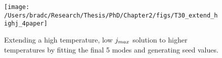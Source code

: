\documentclass[../PhD.tex]{subfiles}
\begin{document}
\begin{figure}[ht]
	\centering
	\texttt{[image: /Users/bradc/Research/Thesis/PhD/Chapter2/figs/T30\_extend\_highj\_4paper]}
	\caption[Constructing high temperature solutions by hand]{Extending a high temperature, low $j_{max}$ solution to higher temperatures by fitting the final 5 modes and generating seed values.}
	\label{fig: manual highT}
\end{figure}




\end{document}

